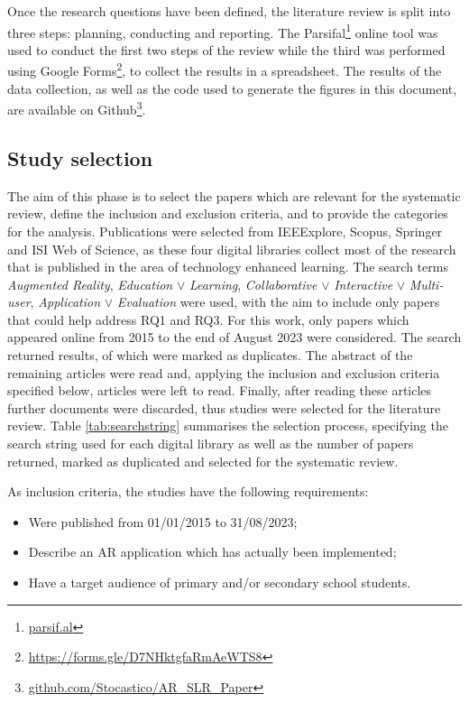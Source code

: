 Once the research questions have been defined, the literature review is split into three steps: planning, conducting and reporting. The Parsifal\footnote{\url{parsif.al}} online tool was used to conduct the first two steps of the review while the third was performed using Google Forms\footnote{\url{https://forms.gle/D7NHktgfaRmAeWTS8}}, to collect the results in a spreadsheet. The results of the data collection, as well as the code used to generate the figures in this document, are available on Github\footnote{\url{github.com/Stocastico/AR\_SLR\_Paper}}.


\subsection{Study selection}
The aim of this phase is to select the papers which are relevant for the systematic review, define the inclusion and exclusion criteria, and to provide the categories for the analysis.
Publications were selected from IEEExplore, Scopus, Springer and ISI Web of Science, as these four digital libraries collect most of the research that is published in the area of technology enhanced learning. The search terms \emph{Augmented Reality}, \emph{Education} $\lor$ \emph{Learning}, \emph{Collaborative} $\lor$ \emph{Interactive} $\lor$ \emph{Multi-user}, \emph{Application} $\lor$ \emph{Evaluation} were used, with the aim to include only papers that could help address RQ1 and RQ3. For this work, only papers which appeared online from 2015 to the end of August 2023 were considered. The search returned \allPapers results, of which \duplPapers were marked as duplicates. The abstract of the remaining \papersCheckAbstract articles were read and, applying the inclusion and exclusion criteria specified below, \papersToRead articles were left to read. Finally, after reading these articles \papersExludedAfterReading further documents were discarded, thus \papersSelected studies were selected for the literature review.
Table \ref{tab:searchstring} summarises the selection process, specifying the search string used for each digital library as well as the number of papers returned, marked as duplicated and selected for the systematic review.

As inclusion criteria, the studies have the following requirements:
\begin{itemize}
    \item Were published from 01/01/2015 to 31/08/2023;
    \item Describe an AR application  which has actually been implemented;
    \item Have a target audience of primary and/or secondary school students.
\end{itemize}

